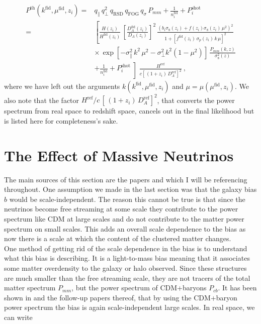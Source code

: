 \documentclass[../main.tex]{subfiles}
\begin{document}
\begin{align}
    P^\mathrm{th}(k^\mathrm{fid},\mu^\mathrm{fid},z_i) =& q_\| \, q_\perp^2 \, q_\mathrm{RSD}\, q_\mathrm{FOG}\, q_\sigma\, P_{mm} + \frac{1}{n_i^\mathrm{fid}} + P_i^\mathrm{shot}\\
    =& \left[\frac{H(z_i)}{H^\mathrm{fid}(z_i)}\, \left[\frac{D^\mathrm{fid}_A(z_i)}{D_A(z_i)}\right]^2 \, \frac{\left(b_i \sigma_8(z_i) + f(z_i) \sigma_8(z_i) \,\mu^2 \right)^2}{1+\left[f^\mathrm{fid}(z_i)\,\sigma_p(z_i)\,k\,\mu\right]^2} \right. \nonumber\\
    &\times\,\exp\left[- \sigma_\|^2 \, k^2\,\mu^2 - \sigma_\perp^2 k^2 \left(1-\mu^2\right) \right]\, \frac{P_{mm}(k,z)}{\sigma_8^2(z)} \nonumber \\
    &+ \left.\frac{1}{n_i^\mathrm{fid}} + P_i^\mathrm{shot}\middle] \frac{H^\mathrm{ref}}{c\left[ \,(1+z_i)\,D_A^\mathrm{ref}\right]^2}\right.\:,\nonumber
\end{align}
where we have left out the arguments $k(k^\mathrm{fid},\mu^\mathrm{fid},z_i)$ and $\mu=\mu(\mu^\mathrm{fid},z_i)$. We also note that the factor $H^\mathrm{ref}/c\,\left[ \,(1+z_i)\,D_A^\mathrm{ref}\right]^2$, that converts the power spectrum from real space to redshift space, cancels out in the final likelihood but is listed here for completeness's sake.

\section{The Effect of Massive Neutrinos}
The main sources of this section are the papers \cite{Raccanelli_2018} and \cite{Vagnozzi:2018pwo} which I will be referencing throughout. One assumption we made in the last section was that the galaxy bias $b$ would be scale-independent. The reason this cannot be true is that since the neutrinos become free streaming at some scale they contribute to the power spectrum like CDM at large scales and do not contribute to the matter power spectrum on small scales. This adds an overall scale dependence to the bias as now there is a scale at which the content of the clustered matter changes.\\
One method of getting rid of the scale dependence in the bias is to understand what this bias is describing. It is a light-to-mass bias meaning that it associates some matter overdensity to the galaxy or halo observed. Since these structures are much smaller than the free streaming scale, they are not tracers of the total matter spectrum $P_{mm}$, but the power spectrum of CDM+baryons $P_{cb}$. It has been shown in \cite{Villaescusa_Navarro_2014} and the follow-up papers thereof, that by using the CDM+baryon power spectrum the bias is again scale-independent large scales. In real space, we can write 
\end{document}
